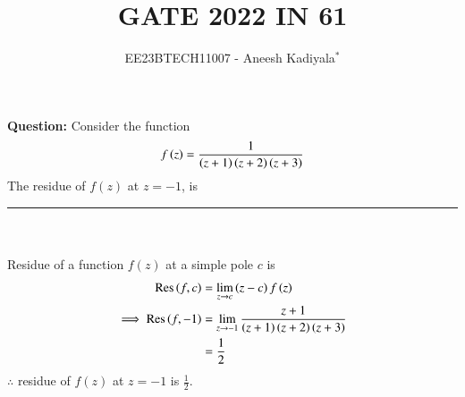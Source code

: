 \documentclass[journal,12pt,twocolumn]{IEEEtran}
\theoremstyle{remark}
\begin{document}

\vspace{3cm}

\title{GATE 2022 IN 61}
\author{EE23BTECH11007 - Aneesh Kadiyala$^{*}$%
}
\maketitle
\newpage
\bigskip

\renewcommand{\thefigure}{\theenumi}
\renewcommand{\thetable}{\theenumi}

\vspace{3cm}
\textbf{Question:} Consider the function
\begin{align*}
f\left(z\right) = \frac{1}{\left(z+1\right)\left(z+2\right)\left(z+3\right)}
\end{align*}
The residue of $f(z)$ at $z=-1$, is \rule{1cm}{0.15mm}
\\
\solution
\\
Residue of a function $f(z)$ at a simple pole $c$ is
\begin{align}
\text{Res}\left(f, c\right) &= \lim_{z \to c}\left(z - c\right)f\left(z\right) \\
\implies \text{Res}\left(f,-1\right) &= \lim_{z \to -1}\frac{z + 1}{\left(z+1\right)\left(z+2\right)\left(z+3\right)} \\
&= \frac{1}{2}
\end{align}
$\therefore$ residue of $f(z)$ at $z = -1$ is $\frac{1}{2}$.
\end{document}
